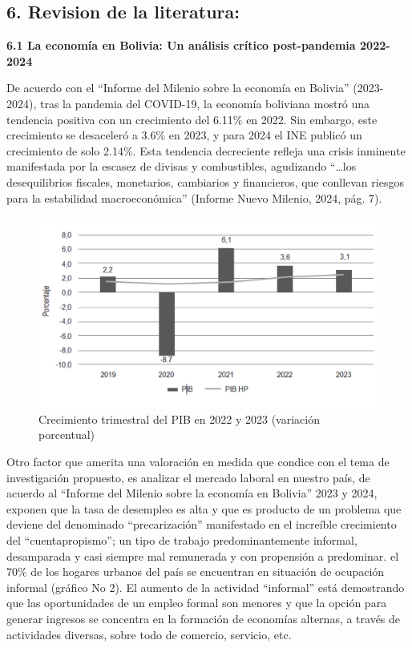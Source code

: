 \documentclass[Royal,times,sageh]{sagej}
\begin{document}
\subsection{\texorpdfstring{6. \textbf{Revision de la
literatura:}}{6. Revision de la literatura:}}\label{revision-de-la-literatura}

\textbf{6.1 La economía en Bolivia: Un análisis crítico post-pandemia
2022-2024}

De acuerdo con el ``Informe del Milenio sobre la economía en Bolivia''
(2023-2024), tras la pandemia del COVID-19, la economía boliviana mostró
una tendencia positiva con un crecimiento del 6.11\% en 2022. Sin
embargo, este crecimiento se desaceleró a 3.6\% en 2023, y para 2024 el
INE publicó un crecimiento de solo 2.14\%. Esta tendencia decreciente
refleja una crisis inminente manifestada por la escasez de divisas y
combustibles, agudizando ``\ldots los desequilibrios fiscales,
monetarios, cambiarios y financieros, que conllevan riesgos para la
estabilidad macroeconómica'' (Informe Nuevo Milenio, 2024, pág. 7).

\begin{figure}

{\centering \includegraphics[width=1\linewidth]{Imagen 1} 

}

\caption{Crecimiento trimestral del PIB en 2022 y 2023 (variación porcentual)}\label{fig:i1}
\end{figure}

Otro factor que amerita una valoración en medida que condice con el tema
de investigación propuesto, es analizar el mercado laboral en nuestro
país, de acuerdo al ``Informe del Milenio sobre la economía en Bolivia''
2023 y 2024, exponen que la tasa de desempleo es alta y que es producto
de un problema que deviene del denominado ``precarización'' manifestado
en el increíble crecimiento del ``cuentapropismo''; un tipo de trabajo
predominantemente informal, desamparada y casi siempre mal remunerada y
con propensión a predominar. el 70\% de los hogares urbanos del país se
encuentran en situación de ocupación informal (gráfico No 2). El aumento
de la actividad ``informal'' está demostrando que las oportunidades de
un empleo formal son menores y que la opción para generar ingresos se
concentra en la formación de economías alternas, a través de actividades
diversas, sobre todo de comercio, servicio, etc.
\end{document}
